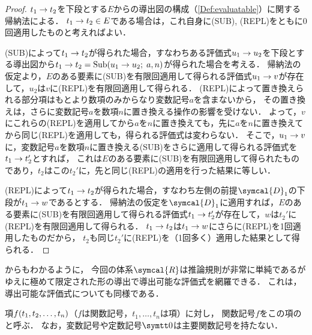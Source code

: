 \begin{proof}
	\(t_1 \to t_2\)を下段とする\(E\)からの導出図の構成（\cref{Def:evaluatable}）に関する帰納法による．
	\(t_1 \to t_2 \in E\)である場合は，これ自身に(SUB), (REPL)をともに0回適用したものと考えればよい．

	(SUB)によって\(t_1 \to t_2\)が得られた場合，すなわちある評価式\(u_1 \to u_2\)を下段とする導出図から\(t_1 \evaluate t_2 = \SubEvaluate{u_1 \evaluate u_2}{a}{n}\)が得られた場合を考える．
	帰納法の仮定より，\(E\)のある要素に(SUB)を有限回適用して得られる評価式\(u_1 \to v\)が存在して，\(u_2\)は\(v\)に(REPL)を有限回適用して得られる．
	(REPL)によって置き換えられる部分項はもとより数項のみからなり変数記号\(a\)を含まないから，
	その置き換えは，さらに変数記号\(a\)を数項\(n\)に置き換える操作の影響を受けない．
	よって，\(v\)にこれらの(REPL)を適用してから\(a\)を\(n\)に置き換えても，先に\(a\)を\(n\)に置き換えてから同じ(REPL)を適用しても，得られる評価式は変わらない．
	そこで，\(u_1 \to v\)に，変数記号\(a\)を数項\(n\)に置き換える(SUB)をさらに適用して得られる評価式を\(t_1 \to t_2'\)とすれば，
	これは\(E\)のある要素に(SUB)を有限回適用して得られたものであり，\(t_2\)はこの\(t_2'\)に，先と同じ(REPL)の適用を行った結果に等しい．

	(REPL)によって\(t_1 \to t_2\)が得られた場合，すなわち左側の前提\(\symcal{D}_1\)の下段が\(t_1 \to w\)であるとする．
	帰納法の仮定を\(\symcal{D}_1\)に適用すれば，\(E\)のある要素に(SUB)を有限回適用して得られる評価式\(t_1 \to t_2'\)が存在して，\(w\)は\(t_2'\)に(REPL)を有限回適用して得られる．
	\(t_1 \to t_2\)は\(t_1 \to w\)にさらに(REPL)を1回適用したものだから，
	\(t_2\)も同じ\(t_2'\)に(REPL)を（1回多く）適用した結果として得られる．
\end{proof}

からもわかるように，
今回の体系\(\symcal{R}\)は推論規則が非常に単純であるがゆえに極めて限定された形の導出で導出可能な評価式を網羅できる．
これは，導出可能な評価式についても同様である．

\begin{Def} \label{Def:computablefunctionheadfunctionsymbol}
	項\(\apply{f}{t_1, t_2, \dots, t_n}\)（\(f\)は関数記号，\(t_1, \dots, t_n\)は項）に対し，
	関数記号\(f\)をこの項のと呼ぶ．
	なお，変数記号や定数記号\(\obj{0}\)は主要関数記号を持たない．
\end{Def}


